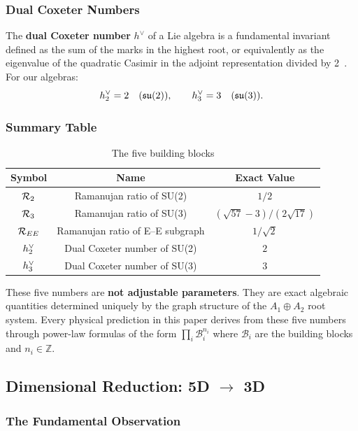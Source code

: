 \subsubsection{Dual Coxeter Numbers}

The \textbf{dual Coxeter number} $h^\vee$ of a Lie algebra is a fundamental invariant defined as the sum of the marks in the highest root, or equivalently as the eigenvalue of the quadratic Casimir in the adjoint representation divided by 2~\cite{coxeter1973special}. For our algebras:
\begin{equation}
h^\vee_2 = 2 \quad (\mathfrak{su}(2)), \qquad h^\vee_3 = 3 \quad (\mathfrak{su}(3)).
\end{equation}

\subsubsection{Summary Table}

\begin{table}[h]
\centering
\caption{The five building blocks}
\label{tab:building_blocks}
\begin{tabular}{ccc}
\hline\hline
Symbol & Name & Exact Value \\
\hline
$\mathcal{R}_2$ & Ramanujan ratio of SU(2) & $1/2$ \\
$\mathcal{R}_3$ & Ramanujan ratio of SU(3) & $(\sqrt{57}-3)/(2\sqrt{17})$ \\
$\mathcal{R}_{EE}$ & Ramanujan ratio of E--E subgraph & $1/\sqrt{2}$ \\
$h^\vee_2$ & Dual Coxeter number of SU(2) & $2$ \\
$h^\vee_3$ & Dual Coxeter number of SU(3) & $3$ \\
\hline\hline
\end{tabular}
\end{table}

These five numbers are \textbf{not adjustable parameters}. They are exact algebraic quantities determined uniquely by the graph structure of the $A_1 \oplus A_2$ root system. Every physical prediction in this paper derives from these five numbers through power-law formulas of the form $\prod_i \mathcal{B}_i^{n_i}$ where $\mathcal{B}_i$ are the building blocks and $n_i \in \mathbb{Z}$.

\subsection{Dimensional Reduction: 5D $\to$ 3D}\label{sec:dimensional_reduction}

\subsubsection{The Fundamental Observation}

